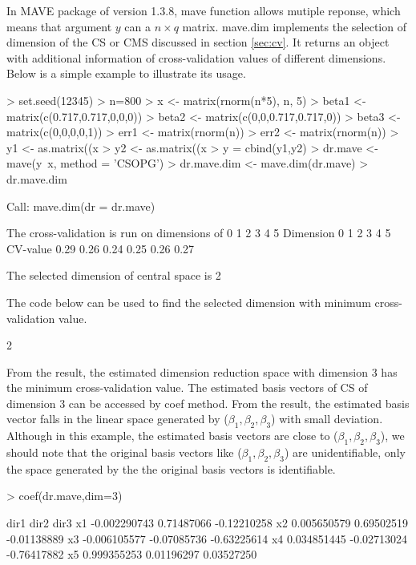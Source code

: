 \documentclass{article}
\newcommand{\code}[1]{\normalfont\ttfamily\hyphenchar\font=-1 #1}
\begin{document}
In MAVE package of version 1.3.8, \code{mave} function allows mutiple reponse, which means that argument $y$ can a $n\times q$ matrix. \code{mave.dim} implements the selection of dimension of the CS or CMS discussed in section \ref{sec:cv}. It returns an object with additional information of cross-validation values of different dimensions. Below is a simple example to illustrate its usage.
\begin{Schunk}
\begin{Sinput}
> set.seed(12345)
> n=800
> x <- matrix(rnorm(n*5), n, 5)
> beta1 <- matrix(c(0.717,0.717,0,0,0))
> beta2 <- matrix(c(0,0,0.717,0.717,0))
> beta3 <- matrix(c(0,0,0,0,1))
> err1 <- matrix(rnorm(n))
> err2 <- matrix(rnorm(n))
> y1 <- as.matrix((x %*% beta1) / (1 + 2 * (x %*% beta2) ^ 2) + (x %*% beta3) * err1)
> y2 <- as.matrix((x%*%beta3)^2) + err2
> y = cbind(y1,y2)
> dr.mave <- mave(y~x, method = 'CSOPG')
> dr.mave.dim <- mave.dim(dr.mave)
> dr.mave.dim
\end{Sinput}
\begin{Soutput}
Call:
mave.dim(dr = dr.mave)

The cross-validation is run on dimensions of 0 1 2 3 4 5 
Dimension	0 	1 	2 	3 	4 	5 	
CV-value	0.29 	0.26 	0.24 	0.25 	0.26 	0.27 	

The selected dimension of  central space  is  2
\end{Soutput}
\end{Schunk}
The code below can be used to find the selected dimension with minimum cross-validation value.
\begin{Schunk}
\begin{Soutput}
[1] 2
\end{Soutput}
\end{Schunk}
From the result, the estimated dimension reduction space with dimension 3 has the minimum cross-validation value. The estimated basis vectors of CS of dimension 3 can be accessed by \code{coef} method. From the result, the estimated basis vector falls in the linear space generated by ($\beta_1,\beta_2,\beta_3$) with small deviation. Although in this example, the estimated basis vectors are close to ($\beta_1,\beta_2,\beta_3$), we should note that the original basis vectors like ($\beta_1,\beta_2,\beta_3$) are unidentifiable, only the space generated by the the original basis vectors is identifiable.
\begin{Schunk}
\begin{Sinput}
> coef(dr.mave,dim=3)
\end{Sinput}
\begin{Soutput}
           dir1        dir2        dir3
x1 -0.002290743  0.71487066 -0.12210258
x2  0.005650579  0.69502519 -0.01138889
x3 -0.006105577 -0.07085736 -0.63225614
x4  0.034851445 -0.02713024 -0.76417882
x5  0.999355253  0.01196297  0.03527250
\end{Soutput}
\end{Schunk}
\end{document}
